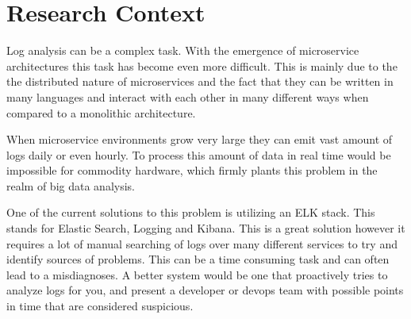 \section{Research Context}

Log analysis can be a complex task. With the emergence of microservice architectures this task has become even more difficult. This is mainly due to the the distributed nature of microservices and the fact that they can be written in many languages and interact with each other in many different ways when compared to a monolithic architecture.

When microservice environments grow very large they can emit vast amount of logs daily or even hourly. To process this amount of data in real time would be impossible for commodity hardware, which firmly plants this problem in the realm of big data analysis.

One of the current solutions to this problem is utilizing an ELK stack. This stands for Elastic Search, Logging and Kibana. This is a great solution however it requires a lot of manual searching of logs over many different services to try and identify sources of problems. This can be a time consuming task and can often lead to a misdiagnoses. A better system would be one that proactively tries to analyze logs for you, and present a developer or devops team with possible points in time that are considered suspicious.